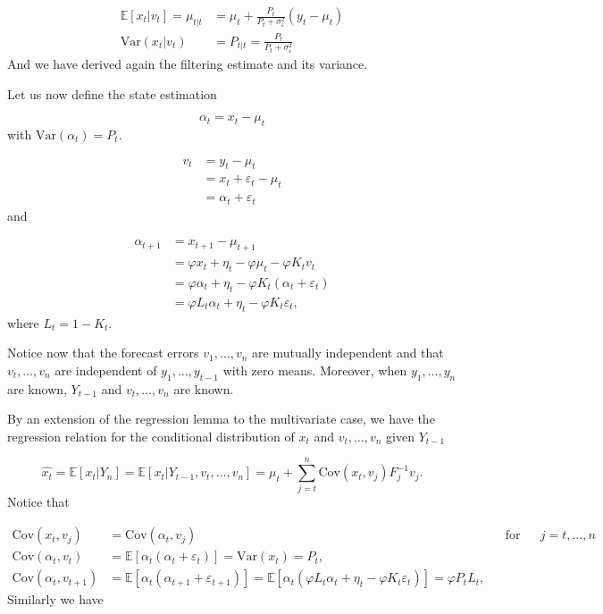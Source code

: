 \documentclass[11pt,a4paper]{article}
\newcommand{\E}{\mathbb{E}}
\newcommand{\var}{\mathrm{Var}}
\newcommand{\cov}{\mathrm{Cov}}
\begin{document}
\begin{align*}
    \E[x_t | v_t] = \mu_{t|t} &= \mu_t + \frac{P_t}{P_t + \sigma^2_\varepsilon}(y_t - \mu_t)\\
    \var(x_t | v_t) &= P_{t|t} = \frac{P_t}{P_t + \sigma^2_\varepsilon}
\end{align*}
And we have derived again the filtering estimate and its variance.

Let us now define the state estimation

\[
    \alpha_t = x_t - \mu_t
\]
with $\var(\alpha_t) = P_t$.

\begin{align*}
    v_t &= y_t - \mu_t\\
    &= x_t + \varepsilon_t - \mu_t\\
    &= \alpha_t + \varepsilon_t
\end{align*}
and

\begin{align*}
    \alpha_{t+1} &= x_{t+1} - \mu_{t+1}\\
    &= \varphi x_t + \eta_t - \varphi \mu_t - \varphi K_t v_t\\
    &= \varphi \alpha_t + \eta_t - \varphi K_t(\alpha_t + \varepsilon_t)\\
    &= \varphi L_t\alpha_t + \eta_t - \varphi K_t\varepsilon_t,
\end{align*}
where    $L_t = 1 - K_t$.

Notice now that the forecast errors $v_1, \dots, v_n$ are mutually independent and that $v_t, \dots, v_n$ are independent of $y_1, \dots, y_{t-1}$ with zero means. Moreover, when $y_1, \dots, y_n$ are known, $Y_{t-1}$ and $v_t, \dots, v_n$ are known.

By an extension of the regression lemma to the multivariate case, we have the regression relation for the conditional distribution of $x_t$ and $v_t, \dots, v_n$ given $Y_{t-1}$

\[
    \hat{x_t} = \E[x_t | Y_n] = \E[x_t | Y_{t-1}, v_t, \dots, v_n] = \mu_t + \sum^n_{j=t} \cov(x_t, v_j)F^{-1}_j v_j.
\]
Notice that

\begin{align*}
    \cov(x_t, v_j) &= \cov(\alpha_t, v_j) && \textrm{for} && j = t, \dots, n\\
    \cov(\alpha_t, v_t) &= \E[\alpha_t(\alpha_t + \varepsilon_t)] = \var(x_t) = P_t,\\
    \cov(\alpha_t, v_{t+1}) &= \E[\alpha_t(\alpha_{t+1} + \varepsilon_{t+1})] = \E[\alpha_t(\varphi L_t\alpha_t + \eta_t - \varphi K_t\varepsilon_t)] = \varphi P_t L_t,
\end{align*}
Similarly we have
\end{document}
